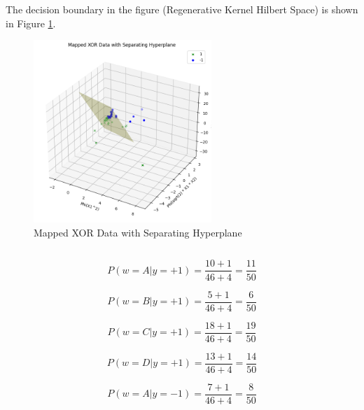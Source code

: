 \documentclass[oneside,solution]{seu-ml-assign}
\begin{document}
The decision boundary in the figure (Regenerative Kernel Hilbert Space) is shown in Figure \ref{1.2.c2}.

\begin{figure}[htbp]
  \centering
  \includegraphics[width=0.6\textwidth]{1.2.c2.png}
  \caption[Mapped XOR Data with Separating Hyperplane]{Mapped XOR Data with Separating Hyperplane}
  \label{1.2.c2}
\end{figure}


\subsection{}

\begin{equation}
  P(w = A | y = +1) = \frac{10 + 1}{46 + 4} = \frac{11}{50}
\end{equation}

\begin{equation}
  P(w = B | y = +1) = \frac{5 + 1}{46 + 4} = \frac{6}{50}
\end{equation}

\begin{equation}
  P(w = C | y = +1) = \frac{18 + 1}{46 + 4} = \frac{19}{50}
\end{equation}

\begin{equation}
  P(w = D | y = +1) = \frac{13 + 1}{46 + 4} = \frac{14}{50}
\end{equation}

\begin{equation}
  P(w = A | y = -1) = \frac{7 + 1}{46 + 4} = \frac{8}{50}
\end{equation}
\end{document}
